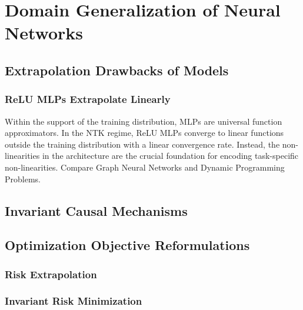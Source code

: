 

\chapter{Domain Generalization of Neural Networks}
\section{Extrapolation Drawbacks of Models}
\subsection{ReLU MLPs Extrapolate Linearly}
Within the support of the training distribution, MLPs are universal function approximators.
In the NTK regime, ReLU MLPs converge to linear functions outside the training distribution with a linear convergence rate.
Instead, the non-linearities in the architecture are the crucial foundation for encoding task-specific non-linearities. Compare Graph Neural Networks and Dynamic Programming Problems.

\section{Invariant Causal Mechanisms}

\section{Optimization Objective Reformulations}
\subsection{Risk Extrapolation}

\subsection{Invariant Risk Minimization}

